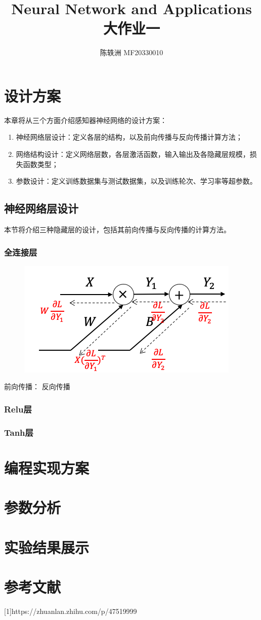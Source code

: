 \documentclass{article}
\title{Neural Network and Applications\\ 大作业一}
\author{陈轶洲 MF20330010}
\begin{document}
	\maketitle
\section{设计方案}
本章将从三个方面介绍感知器神经网络的设计方案：
\begin{enumerate}[1)]
	\item 神经网络层设计：定义各层的结构，以及前向传播与反向传播计算方法；
	\item 网络结构设计：定义网络层数，各层激活函数，输入输出及各隐藏层规模，损失函数类型；
	\item 参数设计：定义训练数据集与测试数据集，以及训练轮次、学习率等超参数。
\end{enumerate}
\subsection{神经网络层设计}
本节将介绍三种隐藏层的设计，包括其前向传播与反向传播的计算方法。
\subsubsection{全连接层}
\begin{figure}[H]
	\centering
	\includegraphics[scale=0.6]{FC.png}
\end{figure}
前向传播：
反向传播
\subsubsection{Relu层}

\subsubsection{Tanh层}

\section{编程实现方案}


\section{参数分析}


\section{实验结果展示}


\section{参考文献}
[1]https://zhuanlan.zhihu.com/p/47519999
\end{document}

